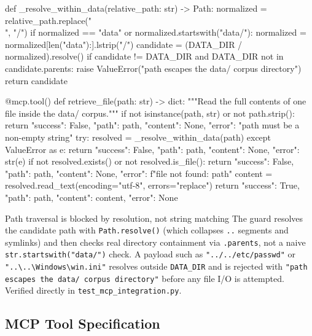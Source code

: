 \documentclass[11pt,a4paper]{article}
\begin{document}
\begin{pycode}
def _resolve_within_data(relative_path: str) -> Path:
    normalized = relative_path.replace("\\", "/")
    if normalized == "data" or normalized.startswith("data/"):
        normalized = normalized[len("data"):].lstrip("/")
    candidate = (DATA_DIR / normalized).resolve()
    if candidate != DATA_DIR and DATA_DIR not in candidate.parents:
        raise ValueError("path escapes the data/ corpus directory")
    return candidate

@mcp.tool()
def retrieve_file(path: str) -> dict:
    """Read the full contents of one file inside the data/ corpus."""
    if not isinstance(path, str) or not path.strip():
        return {"success": False, "path": path, "content": None,
                 "error": "path must be a non-empty string"}
    try:
        resolved = _resolve_within_data(path)
    except ValueError as e:
        return {"success": False, "path": path, "content": None, "error": str(e)}
    if not resolved.exists() or not resolved.is_file():
        return {"success": False, "path": path, "content": None,
                 "error": f"file not found: {path}"}
    content = resolved.read_text(encoding="utf-8", errors="replace")
    return {"success": True, "path": path, "content": content, "error": None}
\end{pycode}

\begin{dangerbox}{Path traversal is blocked by resolution, not string matching}
The guard resolves the candidate path with \texttt{Path.resolve()} (which
collapses \texttt{..} segments and symlinks) and then checks real
directory containment via \texttt{.parents}, not a naive
\texttt{str.startswith("data/")} check. A payload such as
\texttt{"../../etc/passwd"} or \texttt{"..\textbackslash..\textbackslash Windows\textbackslash win.ini"}
resolves outside \texttt{DATA\_DIR} and is rejected with
\texttt{"path escapes the data/ corpus directory"} before any file I/O is
attempted. Verified directly in \texttt{test\_mcp\_integration.py}.
\end{dangerbox}

\subsection{MCP Tool Specification}
\end{document}
